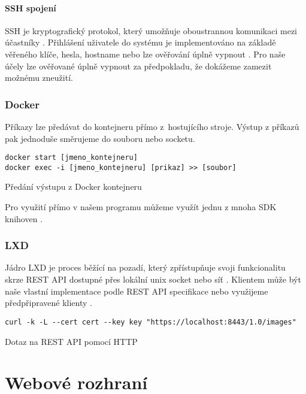 \paragraph{SSH spojení}

SSH je kryptografický protokol, který umožňuje oboustrannou komunikaci mezi účastníky \cite{ssh_rfc}.
Přihlášení uživatele do systému je implementováno na základě věřeného klíče, hesla, hostname nebo lze ověřování úplně vypnout \cite{ssh_auth_rfc}.
Pro naše účely lze ověřované úplně vypnout za předpokladu, že dokážeme zamezit možnému zneužití.

\subsubsection{Docker}

Příkazy lze předávat do kontejneru přímo z~hostujícího stroje.
Výstup z příkazů pak jednoduše směrujeme do souboru nebo socketu.

\begin{listing}[ht]
\begin{verbatim}
docker start [jmeno_kontejneru]
docker exec -i [jmeno_kontejneru] [prikaz] >> [soubor]
\end{verbatim}
\caption{Předání výstupu z Docker kontejneru}
\end{listing}

Pro využití přímo v našem programu můžeme využít jednu z mnoha SDK knihoven \cite{docker_sdk}.

\subsubsection{LXD}

Jádro LXD je proces běžící na pozadí, který zpřístupňuje svoji funkcionalitu skrze REST API dostupné přes lokální unix socket nebo síť \cite{lxd}.
Klientem může být naše vlastní implementace podle REST API specifikace nebo využijeme předpřipravené klienty \cite{lxd_rest}.

\begin{listing}[ht]
\begin{verbatim}
curl -k -L --cert cert --key key "https://localhost:8443/1.0/images"
\end{verbatim}
\caption{Dotaz na REST API pomocí HTTP}
\end{listing}

\section{Webové rozhraní}


